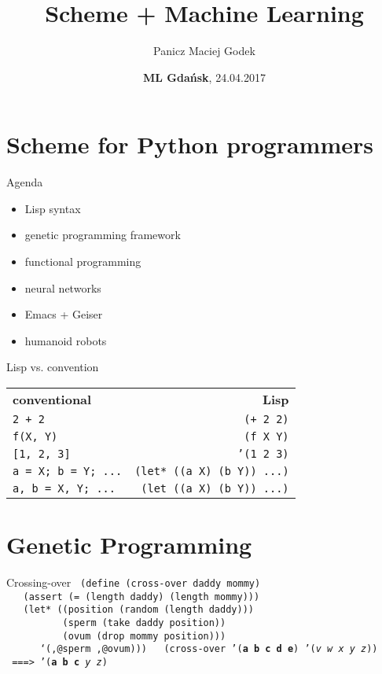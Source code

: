 \documentclass{beamer}
\title{\textbf{Scheme + Machine Learning}}
\author{Panicz Maciej Godek}
\institute{
  \tiny{\href{mailto:godek.maciek@gmail.com}{\textbf{godek.maciek@gmail.com}}} \\
  \normalsize{\url{https://github.com/panicz/writings/tree/master/talks/mlgdansk}}
}
\date{\textbf{ML Gdańsk}, 24.04.2017}
\begin{document}
\begin{frame}
  \titlepage
\end{frame}

\section{Scheme for Python programmers}

\begin{frame}{Agenda}
  \begin{itemize} \pause
  \item Lisp syntax \pause
  \item genetic programming framework \pause
  \item functional programming \pause
  \item neural networks \pause
  \item Emacs + Geiser \pause
  \item humanoid robots
  \end{itemize}
\end{frame}


\begin{frame}{Lisp vs. convention}
  \begin{tabular}{ l r }
    \textbf{conventional} & \textbf{Lisp} \\ \pause
    \texttt{2 + 2} & \texttt{(+ 2 2)} \\ \pause
    \texttt{f(X, Y)} & \texttt{(f X Y)} \\ \pause
    \texttt{[1, 2, 3]} & \texttt{'(1 2 3)} \\ \pause
    \texttt{a = X; b = Y; ...} & \texttt{(let* ((a X) (b Y)) ...)} \\ \pause
    \texttt{a, b = X, Y; ...} & \texttt{(let ((a X) (b Y)) ...)} \\
  \end{tabular}
\end{frame}

\section{Genetic Programming}

\begin{frame}{Crossing-over}
  \texttt{
(define (cross-over daddy mommy)\\ \pause
\ \ \ (assert (= (length daddy) (length mommy)))\\ \pause
\ \ \ (let* ((position (random (length daddy)))\\ \pause
\ \ \ \ \ \ \ \ \ \ (sperm (take daddy position))\\ \pause
\ \ \ \ \ \ \ \ \ \ (ovum (drop mommy position)))\\ \pause
\ \ \ \ \ \ `(,@sperm ,@ovum))) \\ \pause
\ \\
(cross-over '(\textbf{a b c d e}) '(\textit{v w x y z})) \\ \pause
\ ===> '(\textbf{a b c} \textit{y z})
}
\end{frame}
\end{document}
